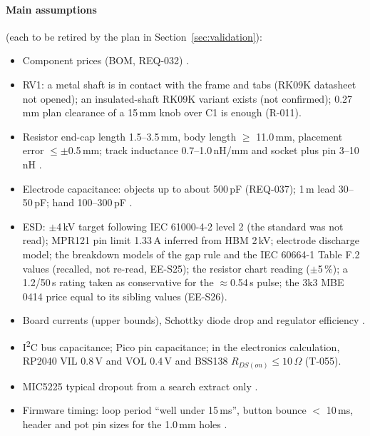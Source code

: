 \paragraph{Main assumptions} (each to be retired by the plan in
Section~\ref{sec:validation}):
\begin{itemize}[noitemsep]
  \item Component prices (BOM, REQ-032) .
  \item RV1: a metal shaft is in contact with the frame and tabs (RK09K datasheet
        not opened); an insulated-shaft RK09K variant exists (not confirmed); 0.27\,mm
        plan clearance of a 15\,mm knob over C1 is enough
         (R-011).
  \item Resistor end-cap length 1.5--3.5\,mm, body length $\ge$ 11.0\,mm, placement
        error $\le\pm$0.5\,mm; track inductance 0.7--1.0\,nH/mm and socket plus pin
        3--10\,nH .
  \item Electrode capacitance: objects up to about 500\,pF (REQ-037); 1\,m lead
        30--50\,pF; hand 100--300\,pF .
  \item ESD: $\pm$4\,kV target following IEC 61000-4-2 level 2 (the standard was not
        read); MPR121 pin limit 1.33\,A inferred from HBM 2\,kV; electrode discharge
        model; the breakdown models of the gap rule and the IEC 60664-1 Table F.2
        values (recalled, not re-read, EE-S25); the resistor chart reading
        ($\pm$5\,\%); a 1.2/50\,\textmu s rating taken as conservative for the
        $\approx$0.54\,\textmu s pulse; the 3k3 MBE 0414 price equal to its sibling
        values (EE-S26).
  \item Board currents (upper bounds), Schottky diode drop and regulator
        efficiency .
  \item I\textsuperscript{2}C bus capacitance; Pico pin capacitance; in the
        electronics calculation, RP2040 VIL 0.8\,V and VOL 0.4\,V and BSS138
        $R_{DS(on)} \le 10\,\Omega$ (T-055).
  \item MIC5225 typical dropout from a search extract only
        .
  \item Firmware timing: loop period ``well under 15\,ms'', button bounce
        $<$ 10\,ms, header and pot pin sizes for the 1.0\,mm holes
        .
\end{itemize}

